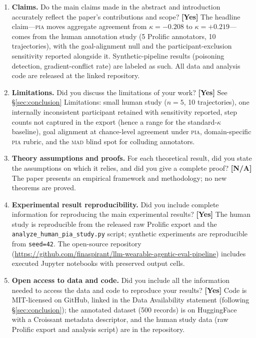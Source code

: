 \documentclass{article}
\newcommand{\PIA}{\textsc{pia}}          %
\newcommand{\answerYes}[1]{\textbf{[Yes]} #1}
\newcommand{\answerNA}[1]{\textbf{[N/A]} #1}
\begin{document}
\begin{enumerate}

\item[\textbf{1.}] \textbf{Claims.}
Do the main claims made in the abstract and introduction accurately
reflect the paper's contributions and scope?
\answerYes{The headline claim---\PIA{} moves aggregate agreement from
  $\kappa = -0.208$ to $\kappa = +0.219$---comes from the human annotation
  study (5 Prolific annotators, 10 trajectories), with the goal-alignment
  null and the participant-exclusion sensitivity reported alongside it.
  Synthetic-pipeline results (poisoning detection, gradient-conflict rate)
  are labeled as such. All data and analysis code are released at the linked
  repository.}

\item[\textbf{2.}] \textbf{Limitations.}
Did you discuss the limitations of your work?
\answerYes{See \S\ref{sec:conclusion} Limitations: small human study
  ($n=5$, 10 trajectories), one internally inconsistent participant retained
  with sensitivity reported, step counts not captured in the export (hence a
  range for the standard-$\kappa$ baseline), goal alignment at chance-level
  agreement under \PIA{}, domain-specific \PIA{} rubric, and the \textsc{mad}
  blind spot for colluding annotators.}

\item[\textbf{3.}] \textbf{Theory assumptions and proofs.}
For each theoretical result, did you state the assumptions on which it
relies, and did you give a complete proof?
\answerNA{The paper presents an empirical framework and methodology;
  no new theorems are proved.}

\item[\textbf{4.}] \textbf{Experimental result reproducibility.}
Did you include complete information for reproducing the main
experimental results?
\answerYes{The human study is reproducible from the released raw Prolific
  export and the \texttt{analyze\_human\_pia\_study.py} script; synthetic
  experiments are reproducible from \texttt{seed=42}. The open-source
  repository
  (\url{https://github.com/finaspirant/llm-wearable-agentic-eval-pipeline})
  includes executed Jupyter notebooks with preserved output cells.}

\item[\textbf{5.}] \textbf{Open access to data and code.}
Did you include all the information needed to access the data and code
to reproduce your results?
\answerYes{Code is MIT-licensed on GitHub, linked in the Data Availability
  statement (following \S\ref{sec:conclusion}); the annotated dataset
  (500 records) is on HuggingFace with a Croissant metadata descriptor, and
  the human study data (raw Prolific export and analysis script) are in the
  repository.}


\end{enumerate}
\end{document}
